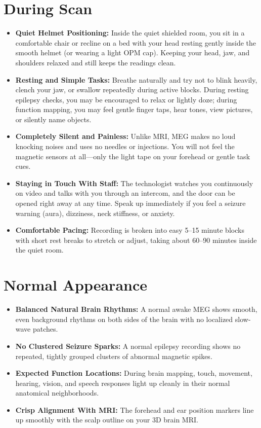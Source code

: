 \section{During Scan}
\begin{itemize}
  \item \textbf{Quiet Helmet Positioning:} Inside the quiet shielded room, you sit in a comfortable chair or recline on a bed with your head resting gently inside the smooth helmet (or wearing a light OPM cap). Keeping your head, jaw, and shoulders relaxed and still keeps the readings clean.
  \item \textbf{Resting and Simple Tasks:} Breathe naturally and try not to blink heavily, clench your jaw, or swallow repeatedly during active blocks. During resting epilepsy checks, you may be encouraged to relax or lightly doze; during function mapping, you may feel gentle finger taps, hear tones, view pictures, or silently name objects.
  \item \textbf{Completely Silent and Painless:} Unlike MRI, MEG makes no loud knocking noises and uses no needles or injections. You will not feel the magnetic sensors at all---only the light tape on your forehead or gentle task cues.
  \item \textbf{Staying in Touch With Staff:} The technologist watches you continuously on video and talks with you through an intercom, and the door can be opened right away at any time. Speak up immediately if you feel a seizure warning (aura), dizziness, neck stiffness, or anxiety.
  \item \textbf{Comfortable Pacing:} Recording is broken into easy 5--15 minute blocks with short rest breaks to stretch or adjust, taking about 60--90 minutes inside the quiet room.
\end{itemize}

\section{Normal Appearance}
\begin{itemize}
  \item \textbf{Balanced Natural Brain Rhythms:} A normal awake MEG shows smooth, even background rhythms on both sides of the brain with no localized slow-wave patches.
  \item \textbf{No Clustered Seizure Sparks:} A normal epilepsy recording shows no repeated, tightly grouped clusters of abnormal magnetic spikes.
  \item \textbf{Expected Function Locations:} During brain mapping, touch, movement, hearing, vision, and speech responses light up cleanly in their normal anatomical neighborhoods.
  \item \textbf{Crisp Alignment With MRI:} The forehead and ear position markers line up smoothly with the scalp outline on your 3D brain MRI.
\end{itemize}

